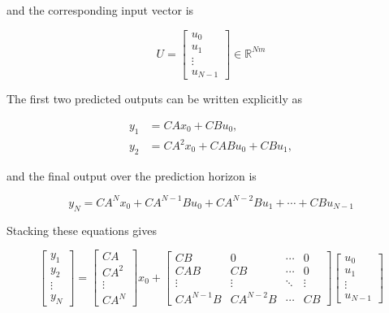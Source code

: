 and the corresponding input vector is

\begin{equation}
    U =
    \begin{bmatrix}
        u_0 \\
        u_1 \\
        \vdots \\
        u_{N-1}
    \end{bmatrix}
    \in \mathbb{R}^{Nm}
    \label{eq:lti_U}
\end{equation}

The first two predicted outputs can be written explicitly as

\begin{align}
    y_1 &= CAx_0 + CBu_0, \\
    y_2 &= CA^2x_0 + CABu_0 + CBu_1,
\end{align}

and the final output over the prediction horizon is

\begin{equation}
    y_N
    =
    CA^N x_0
    +
    CA^{N-1}Bu_0
    +
    CA^{N-2}Bu_1
    +
    \cdots
    +
    CBu_{N-1}
\end{equation}

Stacking these equations gives

\begin{equation}
\begin{bmatrix}
    y_1 \\
    y_2 \\
    \vdots \\
    y_N
\end{bmatrix}
=
\begin{bmatrix}
    CA \\
    CA^2 \\
    \vdots \\
    CA^N
\end{bmatrix}
x_0
+
\begin{bmatrix}
    CB & 0 & \cdots & 0 \\
    CAB & CB & \cdots & 0 \\
    \vdots & \vdots & \ddots & \vdots \\
    CA^{N-1}B & CA^{N-2}B & \cdots & CB
\end{bmatrix}
\begin{bmatrix}
    u_0 \\
    u_1 \\
    \vdots \\
    u_{N-1}
\end{bmatrix}
\label{eq:lti_stacked_expanded}
\end{equation}

